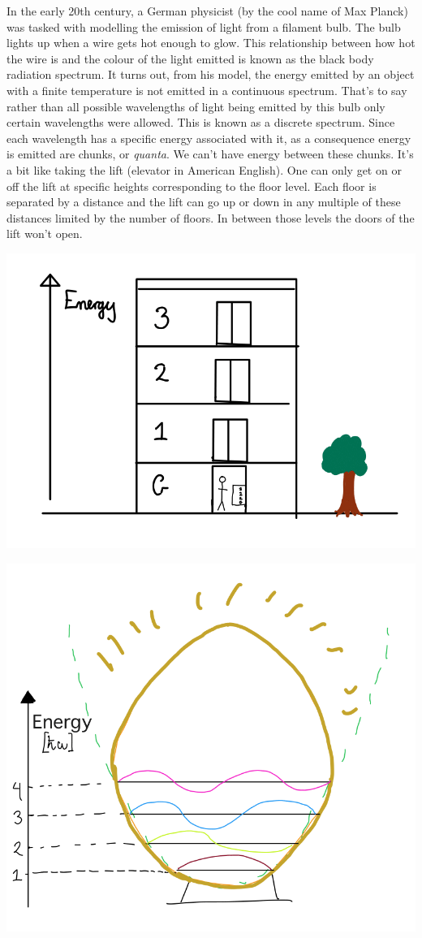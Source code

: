 \documentclass{book}
\begin{document}
In the early 20th century, a German physicist (by the cool name of Max Planck) was tasked with modelling the emission of light from a filament bulb. The bulb lights up when a wire gets hot enough to glow. This relationship between how hot the wire is and the colour of the light emitted is known as the black body radiation spectrum. It turns out, from his model, the energy emitted by an object with a finite temperature is not emitted in a continuous spectrum. That's to say rather than all possible wavelengths of light being emitted by this bulb only certain wavelengths were allowed. This is known as a discrete spectrum. Since each wavelength has a specific energy associated with it, as a consequence energy is emitted are chunks, or \textit{quanta}. We can't have energy between these chunks. It's a bit like taking the lift (elevator in American English). One can only get on or off the lift at specific heights corresponding to the floor level. Each floor is separated by a distance and the lift can go up or down in any multiple of these distances limited by the number of floors. In between those levels the doors of the lift won't open.

\includegraphics{images/Energy_Levels.png}

\includegraphics{images/Light_bulb_quantised.png}
\end{document}
